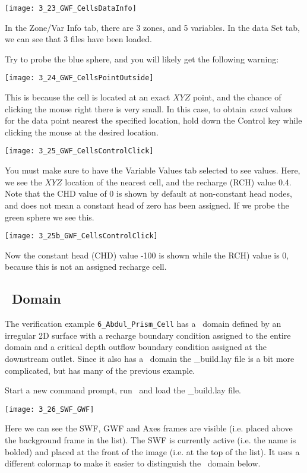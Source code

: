        \texttt{[image: 3\_23\_GWF\_CellsDataInfo]}

In the {\sf Zone/Var Info} tab, there are 3 zones, and 5 variables.  In the {\sf data Set} tab, we can see that 3 files have been loaded.

Try to probe the blue sphere, and you will likely get the following warning:

       \texttt{[image: 3\_24\_GWF\_CellsPointOutside]}

This is because the cell is located at an exact $XYZ$ point, and the chance of clicking the mouse right there is very small.  In this case, to obtain {\it exact} values for the data point nearest the specified location, hold down the {\sf Control} key while clicking the mouse at the desired location.

       \texttt{[image: 3\_25\_GWF\_CellsControlClick]}

You must make sure to have the {\sf Variable Values} tab selected to see values. Here, we see the $XYZ$ location of the nearest cell, and the recharge ({\sf RCH}) value 0.4.  Note that the {\sf CHD} value of 0 is shown by default at non-constant head nodes, and does not mean a constant head of zero has been assigned.   If we  probe the green sphere we see this.

       \texttt{[image: 3\_25b\_GWF\_CellsControlClick]}

Now the constant head ({\sf CHD}) value -100 is shown while the {\sf RCH}) value is 0, because this is not an assigned recharge cell.

\subsection{\swf\ Domain}
The verification example \texttt{6\_Abdul\_Prism\_Cell} has a \swf\ domain defined by an irregular 2D surface with a recharge boundary condition assigned to the entire domain and a critical depth outflow boundary condition assigned at the downstream outlet. Since it also has a \gwf\ domain the {\sf \_build.lay} file is a bit more complicated, but has many of the previous example.

Start a new command prompt, run \tecplot\ and load the {\sf \_build.lay} file.

        \texttt{[image: 3\_26\_SWF\_GWF]}

Here we can see the {\sf SWF, GWF} and {\sf Axes} frames are visible (i.e. placed above the {\sf background} frame in the list).  The {\sf SWF} is currently active (i.e. the name is bolded) and placed at the front of the image (i.e. at the top of the list). It uses a different colormap to make it easier to distinguish the \gwf\ domain below.

